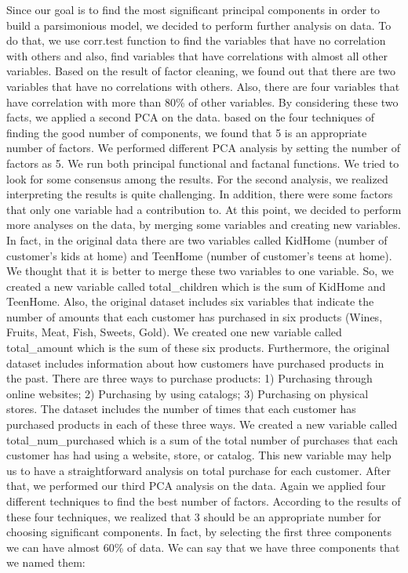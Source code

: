 \documentclass[11pt]{article} %
\begin{document}
\quad Since our goal is to find the most significant principal components in order to build a parsimonious model, we decided to perform further analysis on data. To do that, we use corr.test function to find the variables that have no correlation with others and also, find variables that have correlations with almost all other variables. Based on the result of factor cleaning, we found out that there are two variables that have no correlations with others. Also, there are four variables that have correlation with more than 80\% of other variables. By considering these two facts, we applied a second PCA on the data. based on the four techniques of finding the good number of components, we found that 5 is an appropriate number of factors. We performed different PCA analysis by setting the number of factors as 5. We run both principal functional and factanal functions. We tried to look for some consensus among the results. For the second analysis, we realized interpreting the results is quite challenging. In addition, there were some factors that only one variable had a contribution to. At this point, we decided to perform more analyses on the data, by merging some variables and creating new variables. In fact, in the original data there are two variables called KidHome (number of customer’s kids at home) and TeenHome (number of customer's teens at home). We thought that it is better to merge these two variables to one variable. So, we created a new variable called total\_children which is the sum of KidHome and TeenHome. Also, the original dataset includes six variables that indicate the number of amounts that each customer has purchased in six products (Wines, Fruits, Meat, Fish, Sweets, Gold). We created one new variable called total\_amount which is the sum of these six products. Furthermore, the original dataset includes information about how customers have purchased products in the past. There are three ways to purchase products: 1) Purchasing through online websites; 2) Purchasing by using catalogs; 3) Purchasing on physical stores. The dataset includes the number of times that each customer has purchased products in each of these three ways. We created a new variable called total\_num\_purchased which is a sum of the total number of purchases that each customer has had using a website, store, or catalog. This new variable may help us to have a straightforward analysis on total purchase for each customer. After that, we performed our third PCA analysis on the data. Again we applied four different techniques to find the best number of factors. According to the results of these four techniques, we realized that 3 should be an appropriate number for choosing significant components. In fact, by selecting the first three components we can have almost 60\% of data. We can say that we have three components that we named them: 
\end{document}
